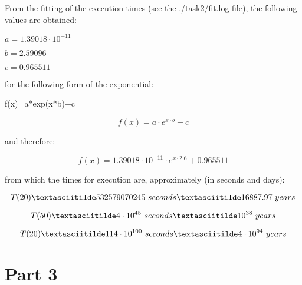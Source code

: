 \documentclass[paper=a4, fontsize=11pt]{scrartcl} %
\numberwithin{equation}{section} %
\numberwithin{figure}{section} %
\numberwithin{table}{section} %
\begin{document}
From the fitting of the execution times (see the ./task2/fit.log file), the following values are obtained:

$a = 1.39018 \cdot 10^{-11}$

$b = 2.59096$

$c = 0.965511$

for the following form of the exponential:

f(x)=a*exp(x*b)+c

$$ f(x) = a\cdot e^{x\cdot b} + c $$

and therefore:

$$ f(x) = 1.39018 \cdot 10^{-11} \cdot e^{x\cdot 2.6} + 0.965511 $$

from which the times for execution are, approximately (in seconds and days):

$$ T(20) \textasciitilde 532579070245 \ seconds \textasciitilde 16887.97 \ years $$

$$ T(50) \textasciitilde 4 \cdot 10^{45} \ seconds \textasciitilde 10^{38} \ years $$

$$ T(20) \textasciitilde 114 \cdot 10^{100} \ seconds \textasciitilde 4 \cdot 10^{94} \ years $$

\section{Part 3}
\end{document}
